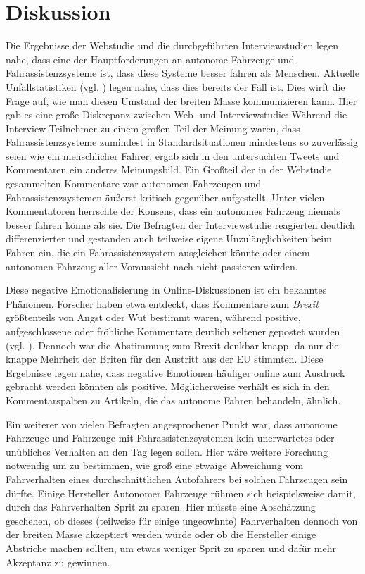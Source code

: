 \section{Diskussion}

Die Ergebnisse der Webstudie und die durchgeführten Interviewstudien legen nahe, dass eine der Hauptforderungen an autonome Fahrzeuge und Fahrassistenzsysteme ist, dass diese Systeme besser fahren als Menschen. Aktuelle Unfallstatistiken (vgl. \cite{singh2015critical}) legen nahe, dass dies bereits der Fall ist. Dies wirft die Frage auf, wie man diesen Umstand der breiten Masse kommunizieren kann. Hier gab es eine große Diskrepanz zwischen Web- und Interviewstudie: Während die Interview-Teilnehmer zu einem großen Teil der Meinung waren, dass Fahrassistenzsysteme zumindest in Standardsituationen mindestens so zuverlässig seien wie ein menschlicher Fahrer, ergab sich in den untersuchten Tweets und Kommentaren ein anderes Meinungsbild. Ein Großteil der in der Webstudie gesammelten Kommentare war autonomen Fahrzeugen und Fahrassistenzsystemen äußerst kritisch gegenüber aufgestellt. Unter vielen Kommentatoren herrschte der Konsens, dass ein autonomes Fahrzeug niemals besser fahren könne als sie. Die Befragten der Interviewstudie reagierten deutlich differenzierter und gestanden auch teilweise eigene Unzulänglichkeiten beim Fahren ein, die ein Fahrassistenzsystem ausgleichen könnte oder einem autonomen Fahrzeug aller Voraussicht nach nicht passieren würden.

Diese negative Emotionalisierung in Online-Diskussionen ist ein bekanntes Phänomen. Forscher haben etwa entdeckt, dass Kommentare zum \emph{Brexit} größtenteils von Angst oder Wut bestimmt waren, während positive, aufgeschlossene oder fröhliche Kommentare deutlich seltener gepostet wurden (vgl. \cite[4]{bossetta2018shouting}). Dennoch war die Abstimmung zum Brexit denkbar knapp, da nur die knappe Mehrheit der Briten für den Austritt aus der EU stimmten. Diese Ergebnisse legen nahe, dass negative Emotionen häufiger online zum Ausdruck gebracht werden könnten als positive. Möglicherweise verhält es sich in den Kommentarspalten zu Artikeln, die das autonome Fahren behandeln, ähnlich.

Ein weiterer von vielen Befragten angesprochener Punkt war, dass autonome Fahrzeuge und Fahrzeuge mit Fahrassistenzsystemen kein unerwartetes oder unübliches Verhalten an den Tag legen sollen. Hier wäre weitere Forschung notwendig um zu bestimmen, wie groß eine etwaige Abweichung vom Fahrverhalten eines durchschnittlichen Autofahrers bei solchen Fahrzeugen sein dürfte. Einige Hersteller Autonomer Fahrzeuge rühmen sich beispielsweise damit, durch das Fahrverhalten Sprit zu sparen. Hier müsste eine Abschätzung geschehen, ob dieses (teilweise für einige ungeowhnte) Fahrverhalten dennoch von der breiten Masse akzeptiert werden würde oder ob die Hersteller einige Abstriche machen sollten, um etwas weniger Sprit zu sparen und dafür mehr Akzeptanz zu gewinnen.

